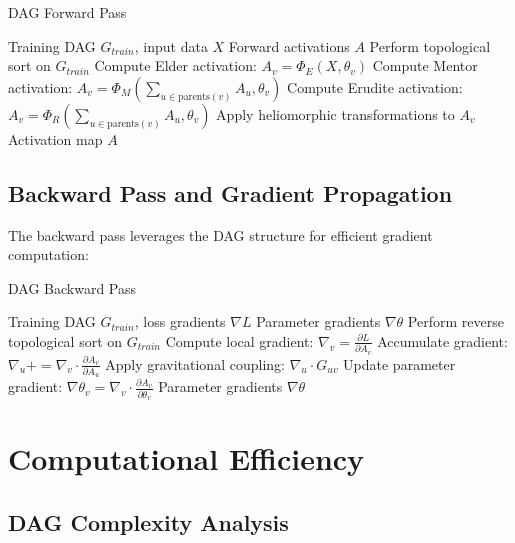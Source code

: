 \begin{algorithm}[H]
\caption{DAG Forward Pass}
\begin{algorithmic}[1]
\REQUIRE Training DAG $G_{train}$, input data $X$
\ENSURE Forward activations $A$
\STATE Perform topological sort on $G_{train}$
        \STATE Compute Elder activation: $A_v = \Phi_E(X, \theta_v)$
        \STATE Compute Mentor activation: $A_v = \Phi_M(\sum_{u \in \text{parents}(v)} A_u, \theta_v)$
        \STATE Compute Erudite activation: $A_v = \Phi_R(\sum_{u \in \text{parents}(v)} A_u, \theta_v)$
    \ENDIF
    \STATE Apply heliomorphic transformations to $A_v$
\ENDFOR
\RETURN Activation map $A$
\end{algorithmic}
\end{algorithm}

\subsection{Backward Pass and Gradient Propagation}

The backward pass leverages the DAG structure for efficient gradient computation:

\begin{algorithm}[H]
\caption{DAG Backward Pass}
\begin{algorithmic}[1]
\REQUIRE Training DAG $G_{train}$, loss gradients $\nabla L$
\ENSURE Parameter gradients $\nabla \theta$
\STATE Perform reverse topological sort on $G_{train}$
    \STATE Compute local gradient: $\nabla_v = \frac{\partial L}{\partial A_v}$
        \STATE Accumulate gradient: $\nabla_u += \nabla_v \cdot \frac{\partial A_v}{\partial A_u}$
        \STATE Apply gravitational coupling: $\nabla_u \cdot G_{uv}$
    \ENDFOR
    \STATE Update parameter gradient: $\nabla \theta_v = \nabla_v \cdot \frac{\partial A_v}{\partial \theta_v}$
\ENDFOR
\RETURN Parameter gradients $\nabla \theta$
\end{algorithmic}
\end{algorithm}

\section{Computational Efficiency}

\subsection{DAG Complexity Analysis}

